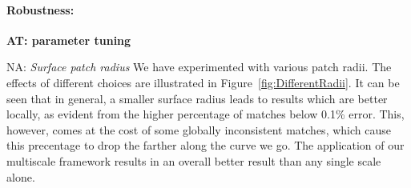 \documentclass[10pt,twocolumn,letterpaper]{article}
\newcommand{\colornote}[3]{{\color{#1}\bf{#2: #3}\normalfont}}
\newcommand{\colornote}[3]{}
\newcommand {\ayellet}[1]{\colornote{blue}{AT}{#1}}
\newcommand {\nadav}[1]{\colornote{red}{NA}{#1}}
\begin{document}
\paragraph{Robustness:} 
\ayellet{parameter tuning}
\nadav{
\textit{Surface patch radius} We have experimented with various patch radii. 
The effects of different choices are illustrated in Figure~\ref{fig:DifferentRadii}.
It can be seen that in general, a smaller surface radius leads to results which are better locally, as evident from the higher percentage of matches below 0.1\% error. 
This, however, comes at the cost of some globally inconsistent matches, which cause this precentage to drop the farther along the curve we go.
The application of our multiscale framework results in an overall better result than any single scale alone.
\begin{figure}[htb]


\end{figure}}
\end{document}
